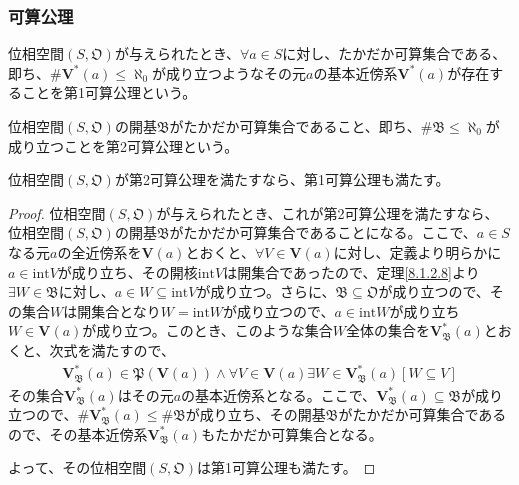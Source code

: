 \documentclass[dvipdfmx]{jsarticle}
\begin{document}
\subsubsection{可算公理}%
\begin{dfn}\label{第1可算公理}
位相空間$\left( S,\mathfrak{O} \right)$が与えられたとき、$\forall a \in S$に対し、たかだか可算集合である、即ち、${\#}{\mathbf{V}^{*}(a)} \leq \aleph_{0}$が成り立つようなその元$a$の基本近傍系$\mathbf{V}^{*}(a)$が存在することを第1可算公理という。
\end{dfn}
\begin{dfn}\label{第2可算公理}
位相空間$\left( S,\mathfrak{O} \right)$の開基$\mathfrak{B}$がたかだか可算集合であること、即ち、${\#}\mathfrak{B} \leq \aleph_{0}$が成り立つことを第2可算公理という。
\end{dfn}
\begin{thm}\label{8.1.2.16}
位相空間$\left( S,\mathfrak{O} \right)$が第2可算公理を満たすなら、第1可算公理も満たす。
\end{thm}
\begin{proof}
位相空間$\left( S,\mathfrak{O} \right)$が与えられたとき、これが第2可算公理を満たすなら、位相空間$\left( S,\mathfrak{O} \right)$の開基$\mathfrak{B}$がたかだか可算集合であることになる。ここで、$a \in S$なる元$a$の全近傍系を$\mathbf{V}(a)$とおくと、$\forall V \in \mathbf{V}(a)$に対し、定義より明らかに$a \in {\mathrm{int}}V$が成り立ち、その開核${\mathrm{int}}V$は開集合であったので、定理\ref{8.1.2.8}より$\exists W \in \mathfrak{B}$に対し、$a \in W \subseteq {\mathrm{int}}V$が成り立つ。さらに、$\mathfrak{B \subseteq O}$が成り立つので、その集合$W$は開集合となり$W = {\mathrm{int}}W$が成り立つので、$a \in {\mathrm{int}}W$が成り立ち$W \in \mathbf{V}(a)$が成り立つ。このとき、このような集合$W$全体の集合を$\mathbf{V}_{\mathfrak{B}}^{*}(a)$とおくと、次式を満たすので、
\begin{align*}
\mathbf{V}_{\mathfrak{B}}^{*}(a)\in \mathfrak{P}\left( \mathbf{V}(a) \right) \land \forall V \in \mathbf{V}(a)\exists W \in \mathbf{V}_{\mathfrak{B}}^{*}(a)[ W \subseteq V]
\end{align*}
その集合$\mathbf{V}_{\mathfrak{B}}^{*}(a)$はその元$a$の基本近傍系となる。ここで、$\mathbf{V}_{\mathfrak{B}}^{*}(a)\subseteq \mathfrak{B}$が成り立つので、${\#}{\mathbf{V}_{\mathfrak{B}}^{*}(a)} \leq {\#}\mathfrak{B}$が成り立ち、その開基$\mathfrak{B}$がたかだか可算集合であるので、その基本近傍系$\mathbf{V}_{\mathfrak{B}}^{*}(a)$もたかだか可算集合となる。\par
よって、その位相空間$\left( S,\mathfrak{O} \right)$は第1可算公理も満たす。
\end{proof}
\end{document}
